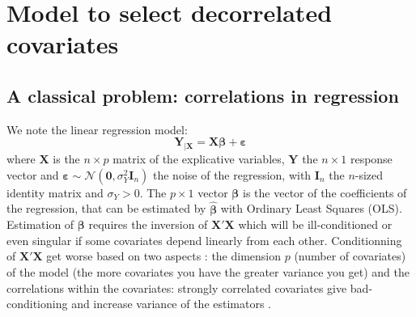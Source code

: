 \documentclass[11pt,a4paper]{article}
\begin{document}
\section{Model to select decorrelated covariates}
\subsection{A classical problem: correlations in regression}\label{sectionOLS}
We note the linear regression model:
\begin{equation}
		\boldsymbol{Y}_{|\boldsymbol{X}}=\boldsymbol{X}\boldsymbol{\beta} + \boldsymbol{\varepsilon} \label{regressionsimple}
	\end{equation}
	where $\boldsymbol{X}$ is the $n\times p$ matrix of the explicative variables, $\boldsymbol{Y}$ the  $n\times 1$ response vector and $\boldsymbol{\varepsilon} \sim \mathcal{N}(\boldsymbol{0},\sigma_Y^2\boldsymbol{I}_n)$ the noise of the regression, with $\boldsymbol{I}_n$ the $n$-sized identity matrix and $\sigma_Y >0$. The $p\times 1$ vector $\boldsymbol{\beta}$ is the vector of the coefficients of the regression, that can be estimated by $\hat{\boldsymbol{\beta}}$ with Ordinary Least Squares (\textsc{OLS}). %
	Estimation of $\boldsymbol{\beta}$ requires the inversion of $\boldsymbol{X}'\boldsymbol{X}$ which will be ill-conditioned or even singular if some covariates depend linearly from each other. 
Conditionning of $\boldsymbol{X}'\boldsymbol{X}$ get worse based on two aspects : the dimension $p$ (number of covariates) of the model (the more covariates you have the greater variance you get)
	 and the correlations within the covariates: strongly correlated covariates give bad-conditioning and increase variance of the estimators .
\end{document}
